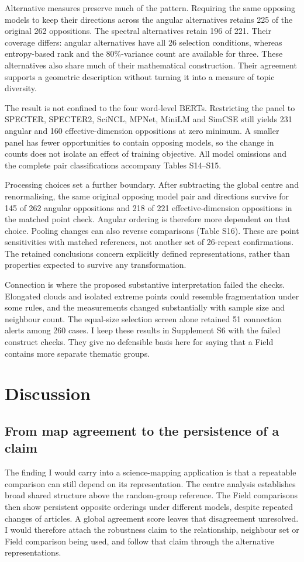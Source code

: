 \documentclass[12pt]{article}
\begin{document}
Alternative measures preserve much of the pattern. Requiring the same opposing models to keep their directions across the angular alternatives retains 225 of the original 262 oppositions. The spectral alternatives retain 196 of 221. Their coverage differs: angular alternatives have all 26 selection conditions, whereas entropy-based rank and the 80\%-variance count are available for three. These alternatives also share much of their mathematical construction. Their agreement supports a geometric description without turning it into a measure of topic diversity.

The result is not confined to the four word-level BERTs. Restricting the panel to SPECTER, SPECTER2, SciNCL, MPNet, MiniLM and SimCSE still yields 231 angular and 160 effective-dimension oppositions at zero minimum. A smaller panel has fewer opportunities to contain opposing models, so the change in counts does not isolate an effect of training objective. All model omissions and the complete pair classifications accompany Tables S14--S15.

Processing choices set a further boundary. After subtracting the global centre and renormalising, the same original opposing model pair and directions survive for 145 of 262 angular oppositions and 218 of 221 effective-dimension oppositions in the matched point check. Angular ordering is therefore more dependent on that choice. Pooling changes can also reverse comparisons (Table S16). These are point sensitivities with matched references, not another set of 26-repeat confirmations. The retained conclusions concern explicitly defined representations, rather than properties expected to survive any transformation.

Connection is where the proposed substantive interpretation failed the checks. Elongated clouds and isolated extreme points could resemble fragmentation under some rules, and the measurements changed substantially with sample size and neighbour count. The equal-size selection screen alone retained 51 connection alerts among 260 cases. I keep these results in Supplement S6 with the failed construct checks. They give no defensible basis here for saying that a Field contains more separate thematic groups.

\section{Discussion}
\subsection{From map agreement to the persistence of a claim}
The finding I would carry into a science-mapping application is that a repeatable comparison can still depend on its representation. The centre analysis establishes broad shared structure above the random-group reference. The Field comparisons then show persistent opposite orderings under different models, despite repeated changes of articles. A global agreement score leaves that disagreement unresolved. I would therefore attach the robustness claim to the relationship, neighbour set or Field comparison being used, and follow that claim through the alternative representations.
\end{document}
